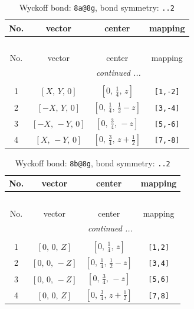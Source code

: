 \documentclass[fleqn,8pt]{jsarticle}
\begin{document}
\begin{longtable}{cccc}
\caption{Wyckoff bond: {\tt 8a@8g}, bond symmetry: {\tt ..2}}
 \\
 \hline \hline
No. & vector & center & mapping \\ \hline \endfirsthead

\multicolumn{3}{l}{\tablename\ \thetable{}} \\
 \hline \hline
No. & vector & center & mapping \\ \hline \endhead

 \hline \hline
\multicolumn{3}{r}{\footnotesize\it continued ...} \\ \endfoot

 \hline \hline
\multicolumn{3}{r}{} \\ \endlastfoot

1 & $\left[ X,\, Y,\, 0 \right]$ & $\left[ 0,\, \frac{1}{4},\, z \right]$ & {\tt [1,-2]} \\ \hline
2 & $\left[ - X,\, Y,\, 0 \right]$ & $\left[ 0,\, \frac{1}{4},\, \frac{1}{2} - z \right]$ & {\tt [3,-4]} \\ \hline
3 & $\left[ - X,\, - Y,\, 0 \right]$ & $\left[ 0,\, \frac{3}{4},\, - z \right]$ & {\tt [5,-6]} \\ \hline
4 & $\left[ X,\, - Y,\, 0 \right]$ & $\left[ 0,\, \frac{3}{4},\, z + \frac{1}{2} \right]$ & {\tt [7,-8]} \\
\end{longtable}
\renewcommand{\arraystretch}{1.2}
\begin{longtable}{cccc}
\caption{Wyckoff bond: {\tt 8b@8g}, bond symmetry: {\tt ..2}}
 \\
 \hline \hline
No. & vector & center & mapping \\ \hline \endfirsthead

\multicolumn{3}{l}{\tablename\ \thetable{}} \\
 \hline \hline
No. & vector & center & mapping \\ \hline \endhead

 \hline \hline
\multicolumn{3}{r}{\footnotesize\it continued ...} \\ \endfoot

 \hline \hline
\multicolumn{3}{r}{} \\ \endlastfoot

1 & $\left[ 0,\, 0,\, Z \right]$ & $\left[ 0,\, \frac{1}{4},\, z \right]$ & {\tt [1,2]} \\ \hline
2 & $\left[ 0,\, 0,\, - Z \right]$ & $\left[ 0,\, \frac{1}{4},\, \frac{1}{2} - z \right]$ & {\tt [3,4]} \\ \hline
3 & $\left[ 0,\, 0,\, - Z \right]$ & $\left[ 0,\, \frac{3}{4},\, - z \right]$ & {\tt [5,6]} \\ \hline
4 & $\left[ 0,\, 0,\, Z \right]$ & $\left[ 0,\, \frac{3}{4},\, z + \frac{1}{2} \right]$ & {\tt [7,8]} \\
\end{longtable}
\end{document}
